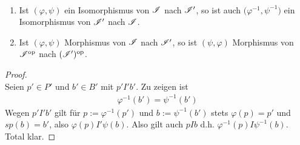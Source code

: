 \begin{lemma}\
	\begin{enumerate}
		\item Ist $(\varphi,\psi)$ ein Isomorphismus von $\mathscr{I}$ nach $\mathscr{I}'$, so ist auch $\big(\varphi^{-1},\psi^{-1}\big)$ ein Isomorphismus von $\mathscr{I}'$ nach $\mathscr{I}$.\label{item:lemma1.13_1}
		\item Ist $(\varphi,\psi)$ Morphismus von $\mathscr{I}$ nach $\mathscr{I}'$, so ist $(\psi,\varphi)$ Morphismus von $\mathscr{I}^{\text{op}}$ nach $(\mathscr{I}')^{\text{op}}$.\label{item:lemma1.13_2}
	\end{enumerate}
\end{lemma}

\begin{proof}
	\\
	Seien $p'\in P'$ und $b'\in B'$ mit $p'I'b'$.
	Zu zeigen ist
	\begin{align*}
		\varphi^{-1}(b')=\psi^{-1}(b')
	\end{align*}
	Wegen $p'I'b'$ gilt für $p:=\varphi^{-1}(p')$ und $b:=\psi^{-1}(b')$ stets $\varphi(p)=p'$ und $sp(b)=b'$, also $\varphi(p)I'\psi(b)$.
	Also gilt auch $pIb$ d.h. $\varphi^{-1}(p)I\psi^{-1}(b)$.\nl
	 Total klar.
\end{proof}

